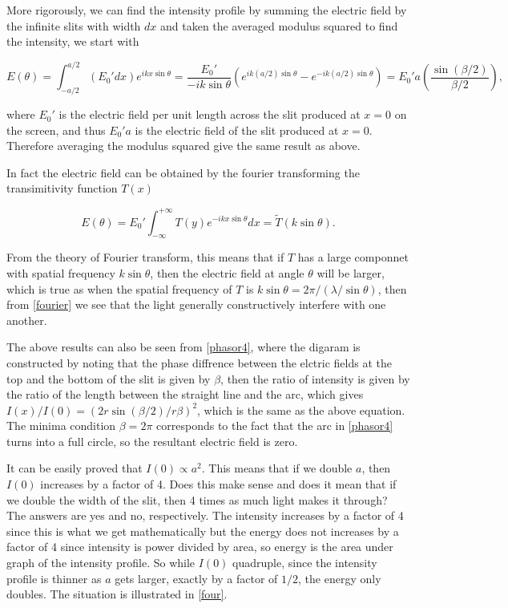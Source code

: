 \documentclass[english,a4paper,12pt]{report}
\begin{document}
More rigorously, we can find the intensity profile by summing the electric field by the infinite slits with width \(dx\) and taken the averaged modulus squared to find the intensity, we start with 

\begin{equation}
    E(\theta ) = \int_{-a /2 }^{a /2 } (E_0 ' dx ) e^{ikx\sin \theta } = \frac{E_0 '}{-ik\sin \theta }\left( e^{ik(a /2)\sin \theta }- e^{-ik(a /2)\sin \theta }   \right) = E_0 'a \left( \frac{\sin \left( \beta /2 \right)}{\beta /2 }  \right), 
\end{equation}

where \(E_0 '\) is the electric field per unit length across the slit produced at \(x=0\) on the screen, and thus \(E_0 'a\) is the electric field of the slit produced at \(x = 0\). Therefore averaging the modulus squared give the same result as above.

In fact the electric field can be obtained by the fourier transforming the transimitivity function \(T(x)\)

\begin{equation}
    E(\theta) = E_0 ' \int_{-\infty}^{+\infty} T(y)e^{-ikx\sin \theta }dx = \tilde{T}(k\sin \theta ).   
\end{equation}

From the theory of Fourier transform, this means that if \(T\) has a large componnet with spatial frequency \(k\sin \theta \), then the electric field at angle \(\theta \) will be larger, which is true as when the spatial frequency of \(T\) is \(k\sin \theta = 2\pi /(\lambda /\sin \theta )\), then from \cref{fourier} we see that the light generally constructively interfere with one another.   

The above results can also be seen from \cref{phasor4}, where the digaram is constructed by noting that the phase diffrence between the elctric fields at the top and the bottom of the slit is given by \(\beta \), then the ratio of intensity is given by the ratio of the length between the straight line and the arc, which gives \(I(x) / I(0) = (2r \sin (\beta /2) /r \beta )^2\), which is the same as the above equation. The minima condition \(\beta = 2\pi \) corresponds to the fact that the arc in \cref{phasor4} turns into a full circle, so the resultant electric field is zero. 


{It can be easily proved that \(I(0) \propto a^2\). This means that if we double \(a\), then \(I(0)\) increases by a factor of 4. Does this make sense and does it mean that if we double the width of the slit, then 4 times as much light makes it through?}
{The answers are yes and no, respectively. The intensity increases by a factor of 4 since this is what we get mathematically but the energy does not increases by a factor of 4 since intensity is power divided by area, so energy is the area under graph of the intensity profile. So while \(I(0)\) quadruple, since the intensity profile is thinner as \(a\) gets larger, exactly by a factor of \(1/2\), the energy only doubles. The situation is illustrated in \cref{four}.}
\end{document}

